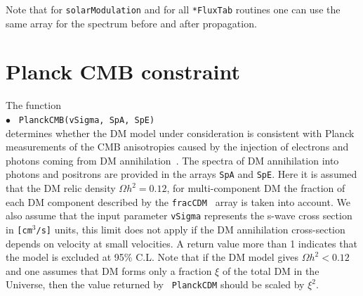 \documentclass[12pt,a4paper]{article}
\begin{document}
Note that for \verb|solarModulation| and for  all \verb|*FluxTab| 
routines one can use  the same array for the spectrum before and after propagation. 



\section{ Planck CMB constraint}
The function \\
 $\bullet$ \verb| PlanckCMB(vSigma, SpA, SpE) |\\
determines whether the DM model under consideration is consistent with Planck measurements of the CMB anisotropies  caused by the injection of electrons and photons coming from DM annihilation~\cite{Slatyer_2016}.   The spectra of DM annihilation into photons and positrons  are provided in the arrays 
{\tt SpA} and {\tt SpE}. Here it is assumed that the DM relic density $\Omega h^2=0.12$,  for  multi-component DM  the fraction of each  DM component  described by the {\tt fracCDM } array is taken into account. We also assume that the input parameter {\tt vSigma} represents  the s-wave cross section  in {\tt  [cm$^3$/s]} units, this limit does not apply if the DM annihilation cross-section depends on  velocity  at small velocities.    
A return value more than 1 indicates that the  model is excluded at 95\% C.L. 
Note that if  the  DM model gives $\Omega h^2<0.12$ and one assumes that DM forms only a fraction  $\xi$ of the  total DM in the Universe, then the value returned by \verb| PlanckCDM| should be scaled  by $\xi^2$.
\end{document}
